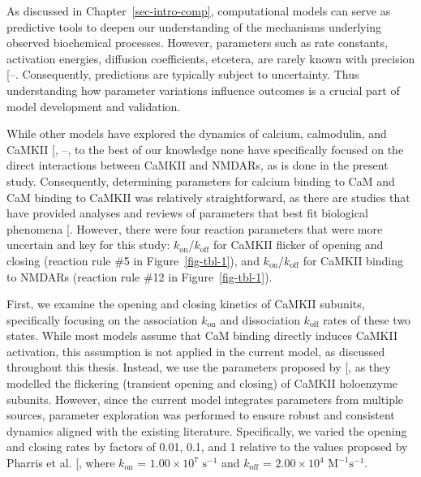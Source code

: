 \documentclass[
  11pt,
  letterpaper,
]{scrreprt}
\begin{document}
As discussed in Chapter~\ref{sec-intro-comp}, computational models can
serve as predictive tools to deepen our understanding of the mechanisms
underlying observed biochemical processes. However, parameters such as
rate constants, activation energies, diffusion coefficients, etcetera,
are rarely known with precision
{[}--\citeproc{ref-mcdonald2022Parameter}{475}{]}.
Consequently, predictions are typically subject to uncertainty. Thus
understanding how parameter variations influence outcomes is a crucial
part of model development and validation.

While other models have explored the dynamics of calcium, calmodulin,
and CaMKII {[},
--\citeproc{ref-bartol2024Spatial}{437}{]},
to the best of our knowledge none have specifically focused on the
direct interactions between CaMKII and NMDARs, as is done in the present
study. Consequently, determining parameters for calcium binding to CaM
and CaM binding to CaMKII was relatively straightforward, as there are
studies that have provided analyses and reviews of parameters that best
fit biological phenomena
{[}\citeproc{ref-linkevicius2025Fitting}{457}{]}. However, there were
four reaction parameters that were more uncertain and key for this
study: \(k_\text{on}\)/\(k_\text{off}\) for CaMKII flicker of opening
and closing (reaction rule \#5 in Figure~\ref{fig-tbl-1}), and
\(k_\text{on}\)/\(k_\text{off}\) for CaMKII binding to NMDARs (reaction
rule \#12 in Figure~\ref{fig-tbl-1}).

First, we examine the opening and closing kinetics of CaMKII subunits,
specifically focusing on the association \(k_\text{on}\) and
dissociation \(k_\text{off}\) rates of these two states. While most
models assume that CaM binding directly induces CaMKII activation, this
assumption is not applied in the current model, as discussed throughout
this thesis. Instead, we use the parameters proposed by
{[}\citeproc{ref-pharris2019Multistate}{185}{]}, as they modelled the
flickering (transient opening and closing) of CaMKII holoenzyme
subunits. However, since the current model integrates parameters from
multiple sources, parameter exploration was performed to ensure robust
and consistent dynamics aligned with the existing literature.
Specifically, we varied the opening and closing rates by factors of
0.01, 0.1, and 1 relative to the values proposed by Pharris et al.
{[}\citeproc{ref-pharris2019Multistate}{185}{]}, where \(k_\text{on}\) =
\(1.00 \times 10^7\) \(\mathrm{s}^{-1}\) and \(k_\text{off}\) =
\(2.00 \times 10^4\) \(\mathrm{M}^{-1}\mathrm{s}^{-1}\).
\end{document}
